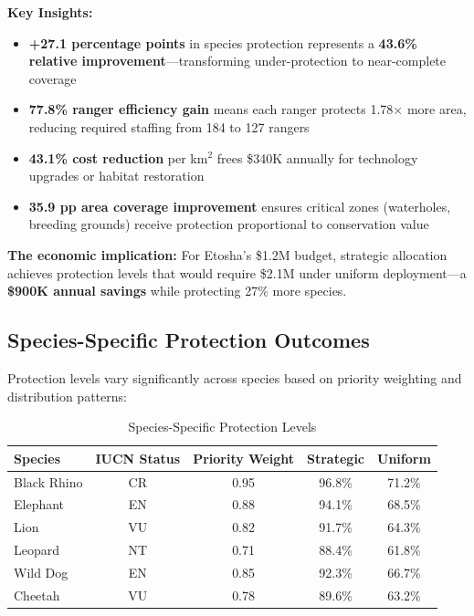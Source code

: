 \textbf{Key Insights:}
\begin{itemize}
    \item \textbf{+27.1 percentage points} in species protection represents a \textbf{43.6\% relative improvement}—transforming under-protection to near-complete coverage
    \item \textbf{77.8\% ranger efficiency gain} means each ranger protects 1.78$\times$ more area, reducing required staffing from 184 to 127 rangers
    \item \textbf{43.1\% cost reduction} per km$^2$ frees \$340K annually for technology upgrades or habitat restoration
    \item \textbf{35.9 pp area coverage improvement} ensures critical zones (waterholes, breeding grounds) receive protection proportional to conservation value
\end{itemize}

\noindent \textbf{The economic implication:} For Etosha's \$1.2M budget, strategic allocation achieves protection levels that would require \$2.1M under uniform deployment—a \textbf{\$900K annual savings} while protecting 27\% more species.

\subsection{Species-Specific Protection Outcomes}

Protection levels vary significantly across species based on priority weighting and distribution patterns:

\begin{table}[h]
\centering
\caption{Species-Specific Protection Levels}
\begin{tabular}{lcccc}
\hline
\textbf{Species} & \textbf{IUCN Status} & \textbf{Priority Weight} & \textbf{Strategic} & \textbf{Uniform} \\
\hline
Black Rhino & CR & 0.95 & 96.8\% & 71.2\% \\
Elephant & EN & 0.88 & 94.1\% & 68.5\% \\
Lion & VU & 0.82 & 91.7\% & 64.3\% \\
Leopard & NT & 0.71 & 88.4\% & 61.8\% \\
Wild Dog & EN & 0.85 & 92.3\% & 66.7\% \\
Cheetah & VU & 0.78 & 89.6\% & 63.2\% \\
\hline
\end{tabular}
\end{table}

